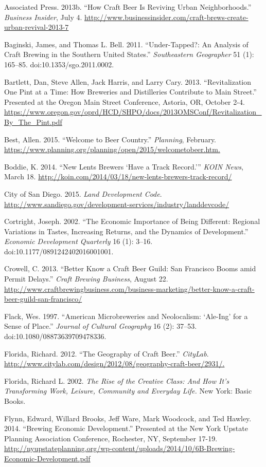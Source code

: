 \documentclass[]{article}
\begin{document}
Associated Press. 2013b. ``How Craft Beer Is Reviving Urban
Neighborhoods.'' \emph{Business Insider}, July 4.
\url{http://www.businessinsider.com/craft-brews-create-urban-revival-2013-7}

Baginski, James, and Thomas L. Bell. 2011. ``Under-Tapped?: An Analysis
of Craft Brewing in the Southern United States.'' \emph{Southeastern
Geographer} 51 (1): 165--85. doi:10.1353/sgo.2011.0002.

Bartlett, Dan, Steve Allen, Jack Harris, and Larry Cary. 2013.
``Revitalization One Pint at a Time: How Breweries and Distilleries
Contribute to Main Street.'' Presented at the Oregon Main Street
Conference, Astoria, OR, October 2-4.
\url{https://www.oregon.gov/oprd/HCD/SHPO/docs/2013OMSConf/Revitalization\_By\_The\_Pint.pdf}

Best, Allen. 2015. ``Welcome to Beer Country.'' \emph{Planning},
February. \url{https://www.planning.org/planning/open/2015/welcometobeer.htm.}

Boddie, K. 2014. ``New Lents Brewers `Have a Track Record.''' \emph{KOIN
News}, March 18.
\url{http://koin.com/2014/03/18/new-lents-brewers-track-record/}

City of San Diego. 2015. \emph{Land Development Code}.
\url{http://www.sandiego.gov/development-services/industry/landdevcode/}

Cortright, Joseph. 2002. ``The Economic Importance of Being Different:
Regional Variations in Tastes, Increasing Returns, and the Dynamics of
Development.'' \emph{Economic Development Quarterly} 16 (1): 3--16.
doi:10.1177/0891242402016001001.

Crowell, C. 2013. ``Better Know a Craft Beer Guild: San Francisco Booms
amid Permit Delays.'' \emph{Craft Brewing Business}, August 22.
\url{http://www.craftbrewingbusiness.com/business-marketing/better-know-a-craft-beer-guild-san-francisco/}

Flack, Wes. 1997. ``American Microbreweries and Neolocalism: `Ale-Ing'
for a Sense of Place.'' \emph{Journal of Cultural Geography} 16 (2):
37--53. doi:10.1080/08873639709478336.

Florida, Richard. 2012. ``The Geography of Craft Beer.'' \emph{CityLab}.
\url{http://www.citylab.com/design/2012/08/geography-craft-beer/2931/.}

Florida, Richard L. 2002. \emph{The Rise of the Creative Class: And How
It's Transforming Work, Leisure, Community and Everyday Life.} New York:
Basic Books.

Flynn, Edward, Willard Brooks, Jeff Ware, Mark Woodcock, and Ted Hawley.
2014. ``Brewing Economic Development.'' Presented at the New York
Upstate Planning Association Conference, Rochester, NY, September 17-19.
\url{http://nyupstateplanning.org/wp-content/uploads/2014/10/6B-Brewing-Economic-Development.pdf}
\end{document}
